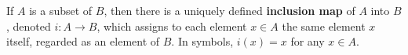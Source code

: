 If $A$ is a subset of $B$, then there is a uniquely defined \textbf{inclusion map} of $A$ into $B$, denoted $i: A \to B$, which assigns to each element $x \in A$ the same element $x$ itself, regarded as an element of $B$. In symbols, $i(x) = x$ for any $x \in A$.
